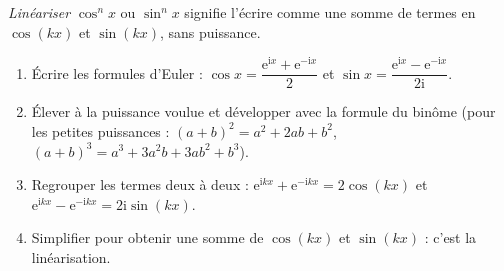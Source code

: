\documentclass[11pt]{article}
\newcommand{\cle}[1]{{\popxbold\color{popdark}#1}}
\begin{document}
\begin{methode}
\emph{Linéariser} $\cos^n x$ ou $\sin^n x$ signifie l'écrire comme une somme de termes en $\cos(kx)$ et $\sin(kx)$, sans puissance.
\begin{enumerate}
\item Écrire les \cle{formules d'Euler} : $\cos x = \dfrac{\mathrm{e}^{\mathrm{i}x}+\mathrm{e}^{-\mathrm{i}x}}{2}$ et $\sin x = \dfrac{\mathrm{e}^{\mathrm{i}x}-\mathrm{e}^{-\mathrm{i}x}}{2\mathrm{i}}$.
\item Élever à la puissance voulue et développer avec la formule du binôme (pour les petites puissances : $(a+b)^2 = a^2+2ab+b^2$, $(a+b)^3 = a^3+3a^2b+3ab^2+b^3$).
\item Regrouper les termes deux à deux : $\mathrm{e}^{\mathrm{i}kx} + \mathrm{e}^{-\mathrm{i}kx} = 2\cos(kx)$ et $\mathrm{e}^{\mathrm{i}kx} - \mathrm{e}^{-\mathrm{i}kx} = 2\mathrm{i}\sin(kx)$.
\item Simplifier pour obtenir une somme de $\cos(kx)$ et $\sin(kx)$ : c'est la \cle{linéarisation}.
\end{enumerate}
\end{methode}
\end{document}
